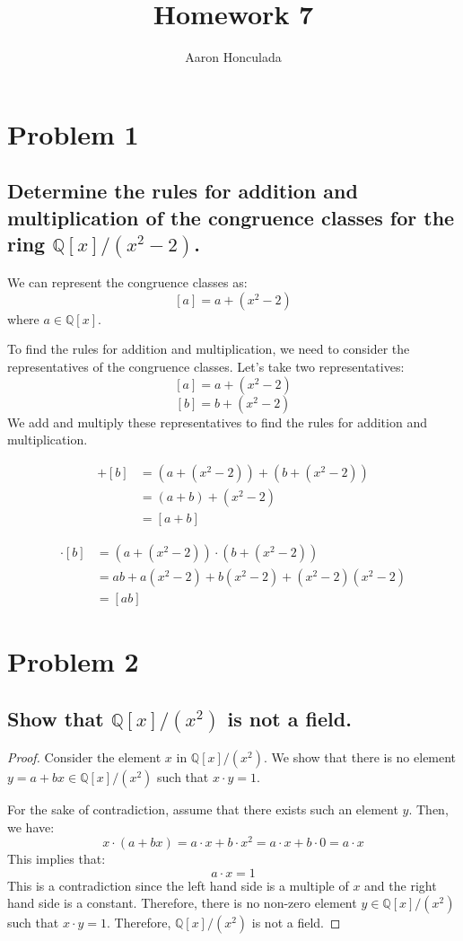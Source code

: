 \documentclass{article}
\title{Homework 7}
\author{Aaron Honculada}
\date{\monthname[\month] \the\year}
\theoremstyle{plain} %
\theoremstyle{definition} %
\begin{document}
\maketitle

\section*{Problem 1}
\subsection*{Determine the rules for addition and multiplication
of the congruence classes for the ring $\mathbb{Q}[x]/(x^2-2)$.}

We can represent the congruence classes as:
\[
    [a] = a + (x^2-2)
\]
where $a \in \mathbb{Q}[x]$.

To find the rules for addition and multiplication, we need to consider the representatives of the congruence classes.
Let's take two representatives:
\[
    [a] = a + (x^2-2)
\]
\[
    [b] = b + (x^2-2)
\]
We add and multiply these representatives to find the rules for addition and multiplication.

\begin{align*}
    [a] + [b] &= (a + (x^2-2)) + (b + (x^2-2)) \\
    &= (a+b) + (x^2-2) \\
    &= [a+b]
\end{align*}

\begin{align*}
    [a] \cdot [b] &= (a + (x^2-2)) \cdot (b + (x^2-2)) \\
    &= ab + a(x^2-2) + b(x^2-2) + (x^2-2)(x^2-2) \\
    &= [ab]
\end{align*}




\section*{Problem 2}
\subsection*{Show that $\mathbb{Q}[x]/(x^2)$ is not a field.}

\begin{proof}
    Consider the element $x$ in $\mathbb{Q}[x]/(x^2)$. We show that there is no element
    $y = a+bx \in \mathbb{Q}[x]/(x^2)$ such that $x \cdot y = 1$.
    
    For the sake of contradiction, assume that there exists such an element $y$.
    Then, we have:
    \[
        x \cdot (a+bx) = a \cdot x + b \cdot x^2 = a \cdot x + b \cdot 0 = a \cdot x
    \]
    This implies that:
    \[
        a \cdot x = 1
    \]
    This is a contradiction since the left hand side is a multiple of $x$ and the right hand side is a constant.
    Therefore, there is no non-zero element $y \in \mathbb{Q}[x]/(x^2)$ such that $x \cdot y = 1$.
    Therefore, $\mathbb{Q}[x]/(x^2)$ is not a field.
\end{proof}
\end{document}
